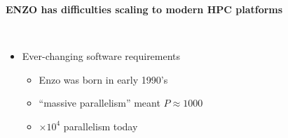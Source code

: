 \begin{frame}[fragile]



\secframetitle{\ssMotivation}
 \centerline{\textbf{ENZO has difficulties scaling to modern HPC platforms}} \ \\
 \begin{minipage}{3in}
\pause
  \begin{itemize}
   \item Ever-changing software requirements
     \begin{itemize}
\footnotesize
   \item  Enzo was born in early 1990's
   \item ``massive parallelism'' meant $P\approx 1000$
   \item $\times 10^4$ parallelism today
     \end{itemize}
   

\end{itemize}
\end{minipage}
\end{frame}
